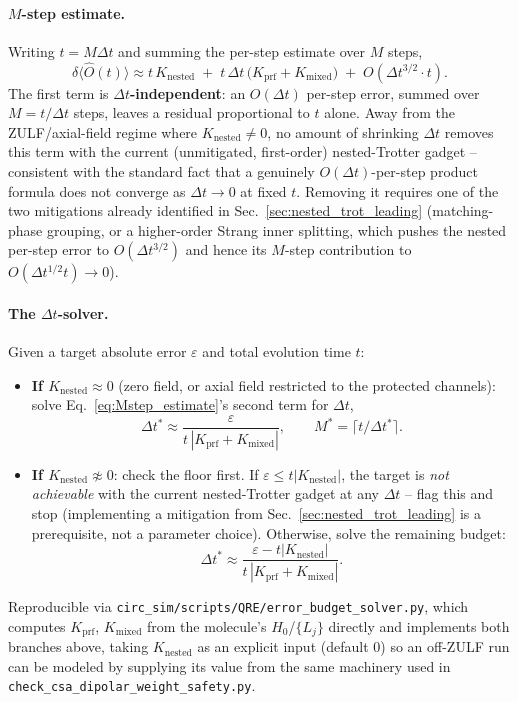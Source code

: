 \documentclass[11pt]{article}
\newcommand{\Dt}{\Delta t}
\begin{document}
\paragraph{\texorpdfstring{$M$}{M}-step estimate.} Writing $t=M\Dt$ and summing the per-step estimate over $M$ steps,
\begin{equation}\label{eq:Mstep_estimate}
    \delta\langle\hat{O}(t)\rangle \approx t\,K_{\text{nested}} \;+\; t\,\Dt\,\big(K_{\text{prf}}+K_{\text{mixed}}\big) \;+\; O(\Dt^{3/2}\cdot t).
\end{equation}
The first term is \textbf{$\Dt$-independent}: an $O(\Dt)$ per-step error, summed over $M=t/\Dt$ steps, leaves a residual proportional to $t$ alone. Away from the ZULF/axial-field regime where $K_{\text{nested}}\neq0$, no amount of shrinking $\Dt$ removes this term with the current (unmitigated, first-order) nested-Trotter gadget -- consistent with the standard fact that a genuinely $O(\Dt)$-per-step product formula does not converge as $\Dt\to0$ at fixed $t$. Removing it requires one of the two mitigations already identified in Sec.~\ref{sec:nested_trot_leading} (matching-phase grouping, or a higher-order Strang inner splitting, which pushes the nested per-step error to $O(\Dt^{3/2})$ and hence its $M$-step contribution to $O(\Dt^{1/2}t)\to0$).

\paragraph{The \texorpdfstring{$\Dt$}{Dt}-solver.} Given a target absolute error $\varepsilon$ and total evolution time $t$:
\begin{itemize}
    \item \textbf{If $K_{\text{nested}}\approx0$} (zero field, or axial field restricted to the protected channels): solve Eq.~\eqref{eq:Mstep_estimate}'s second term for $\Dt$,
    \begin{equation}\label{eq:Dt_solver_zulf}
        \Dt^\ast \approx \frac{\varepsilon}{t\,|K_{\text{prf}}+K_{\text{mixed}}|},\qquad M^\ast=\lceil t/\Dt^\ast\rceil.
    \end{equation}
    \item \textbf{If $K_{\text{nested}}\not\approx0$}: check the floor first. If $\varepsilon\le t|K_{\text{nested}}|$, the target is \emph{not achievable} with the current nested-Trotter gadget at any $\Dt$ -- flag this and stop (implementing a mitigation from Sec.~\ref{sec:nested_trot_leading} is a prerequisite, not a parameter choice). Otherwise, solve the remaining budget:
    \begin{equation}\label{eq:Dt_solver_offzulf}
        \Dt^\ast \approx \frac{\varepsilon-t|K_{\text{nested}}|}{t\,|K_{\text{prf}}+K_{\text{mixed}}|}.
    \end{equation}
\end{itemize}
Reproducible via \texttt{circ\_sim/scripts/QRE/error\_budget\_solver.py}, which computes $K_{\text{prf}}$, $K_{\text{mixed}}$ from the molecule's $H_0$/$\{L_j\}$ directly and implements both branches above, taking $K_{\text{nested}}$ as an explicit input (default $0$) so an off-ZULF run can be modeled by supplying its value from the same machinery used in \texttt{check\_csa\_dipolar\_weight\_safety.py}.
\end{document}
